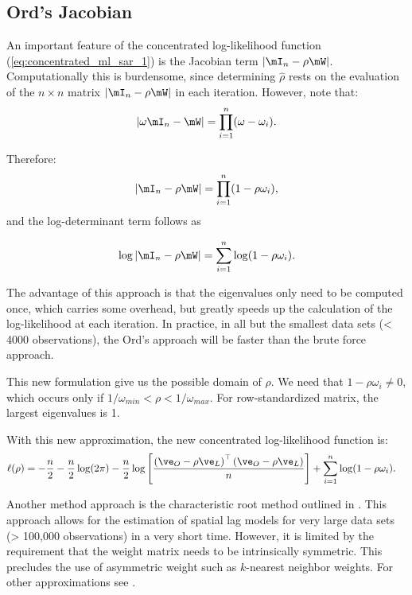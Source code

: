 \documentclass[english,12pt]{book}\usepackage[]{graphicx}\usepackage[]{xcolor}
\begin{document}
\subsection{Ord's Jacobian}

An important feature of the concentrated log-likelihood function (\ref{eq:concentrated_ml_sar_1}) is the Jacobian term $\left|\mI_n - \rho\mW\right|$. Computationally this is burdensome, since determining $\widehat{\rho}$ rests on the evaluation of the $n\times n$ matrix $\left|\mI_n - \rho\mW\right|$ in each iteration. However, \cite{ord1975estimation} note that:
\begin{equation*}
	\left|\omega\mI_n -\mW\right|=\prod_{i=1}^n(\omega-\omega_i).
\end{equation*}	

Therefore:
\begin{equation*}
\left|\mI_n -\rho\mW\right|=\prod_{i=1}^n(1-\rho\omega_i),
\end{equation*}	
%
and the log-determinant term follows as

\begin{equation}\label{eq:Ord-determinant}
\log\left|\mI_n -\rho\mW\right|=\sum_{i=1}^n\log(1 - \rho\omega_i).
\end{equation}

The advantage of this approach is that the eigenvalues only need to be computed once, which carries some overhead, but greatly speeds up the calculation of the log-likelihood at each iteration. In practice, in all but the smallest data sets (< 4000 observations), the Ord's approach will be faster than the brute force approach. 

This new formulation give us the possible domain of $\rho$. We need that $1 - \rho \omega_i \neq 0$, which occurs only if $1/\omega_{min} < \rho < 1/\omega_{max}$. For row-standardized matrix, the largest eigenvalues is 1. 

With this new approximation, the new concentrated log-likelihood function is:
\begin{equation}\label{eq:concentrated_ml_sar_2}
  \begin{aligned}
\ell(\rho)& =-\frac{n}{2}-\frac{n}{2}\log(2\pi) - \frac{n}{2}\log\left[\frac{\left(\ve_O - \rho\ve_L\right)^\top\left(\ve_O - \rho\ve_L\right)}{n}\right] + \sum_{i=1}^n\log(1 - \rho\omega_i).
  \end{aligned}
\end{equation}	

Another method approach is the characteristic root method outlined in \cite{smirnov2001fast}. This approach allows for the estimation of spatial lag models for very large data sets (> 100,000 observations) in a very short time. However, it is limited by the requirement that the weight matrix needs to be intrinsically symmetric. This precludes the use of asymmetric weight such as $k$-nearest neighbor weights. For other approximations see \citet[][chapter 4]{lesage2010introduction}.
\end{document}
